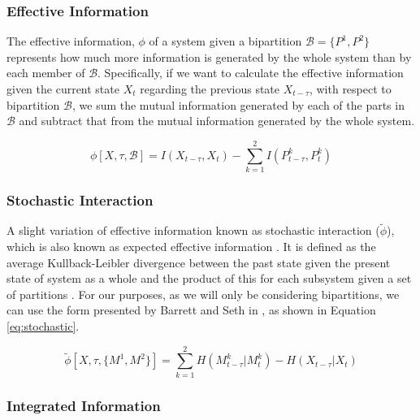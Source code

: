 \documentclass[a4paper,11pt]{article}
\begin{document}
\subsubsection{Effective Information}
\label{EI}

The effective information, $\phi$ of a system given a bipartition $\mathcal{B} = \lbrace P^1, P^2 \rbrace$ represents how much more information is generated by the whole system than by each member of $\mathcal{B}$. Specifically, if we want to calculate the effective information given the current state $X_t$ regarding the previous state $X_{t - \tau}$, with respect to bipartition $\mathcal{B}$, we sum the mutual information generated by each of the parts in $\mathcal{B}$ and subtract that from the mutual information generated by the whole system.

\begin{equation} \label{eq:ei}
\phi [X, \tau, \mathcal{B}] = I(X_{t-\tau}, X_t) - \sum_{k=1}^{2} I(P_{t-\tau}^k, P_{t}^k)
\end{equation}

\subsubsection{Stochastic Interaction}
\label{sec:bg:stochastic}

A slight variation of effective information known as stochastic interaction ($\tilde{\phi}$), which is also known as expected effective information \cite{Barrett2011}. It is defined as the average Kullback-Leibler divergence between the past state given the present state of system as a whole and the product of this for each subsystem given a set of partitions \cite{Ay2015}. For our purposes, as we will only be considering bipartitions, we can use the form presented by Barrett and Seth in \cite{Barrett2011}, as shown in Equation \ref{eq:stochastic}.

\begin{equation} \label{eq:stochastic}
\tilde{\phi} [X, \tau, \{M^1, M^2\}] = \sum_{k=1}^{2} H(M_{t-\tau}^k | M_{t}^k)  - H(X_{t-\tau} | X_t)
\end{equation}

\subsubsection{Integrated Information}
\label{II}
\end{document}
